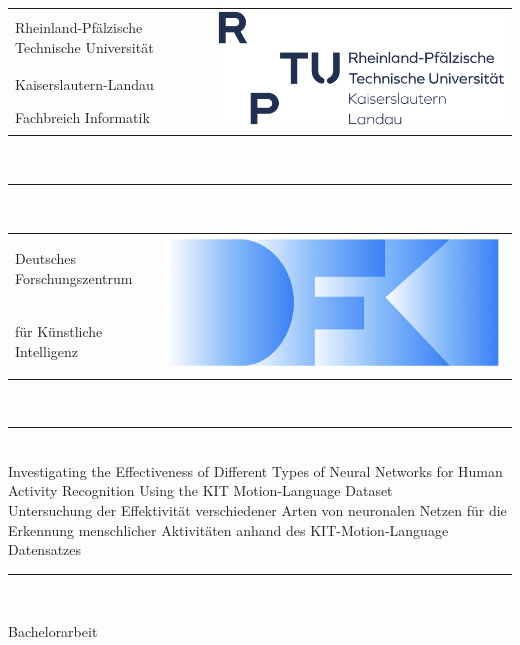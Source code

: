 \begin{titlepage}
    \centering
    \begin{tabular}{p{}p{}}
        Rheinland-Pfälzische Technische Universität& \multirow{3}{*}{\includegraphics[width=.45\textwidth]{img/TUK.png}}\\
        Kaiserslautern-Landau&\\
        Fachbreich Informatik&\\
    \end{tabular}\\
    [\baselineskip]
    \rule{\textwidth}{1pt}\\[.5\baselineskip]
    \begin{tabular}{p{}p{}}
        Deutsches Forschungszentrum & \multirow{2}{*}{\includegraphics[width=.4\textwidth]{img/dfki.png}}\\
        für Künstliche Intelligenz&
    \end{tabular}\\
    [1.5\baselineskip]
    \rule{.8\textwidth}{1.6pt}\\[.25\baselineskip]
        Investigating the Effectiveness of Different Types of Neural Networks for Human Activity Recognition Using the KIT Motion-Language Dataset\\[.4\baselineskip]
        Untersuchung der Effektivität verschiedener Arten von neuronalen Netzen für die Erkennung menschlicher Aktivitäten anhand des KIT-Motion-Language Datensatzes\\[.4\baselineskip]
	\rule{.8\textwidth}{1.6pt}\\[.25\baselineskip]\vfill
	\begin{center}
    	\begin{minipage}{\textwidth}\bfseries
    	    \begin{center}
    	        {\large Bachelorarbeit}
    	    \end{center}

\end{minipage}
\end{center}
\end{titlepage}
